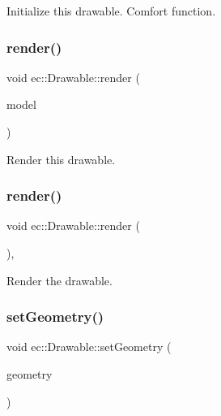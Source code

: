 Initialize this drawable. Comfort function. \mbox{\label{classec_1_1_drawable_ac9d3345bd308fce8c99adbfc12c53106}} 
\subsubsection{\texorpdfstring{render()}{render()}\hspace{0.1cm}{\footnotesize\ttfamily [1/2]}}
{\footnotesize\ttfamily void ec\+::\+Drawable\+::render (\begin{DoxyParamCaption}\item[{const glm\+::mat4 \&}]{model }\end{DoxyParamCaption})\hspace{0.3cm}{\ttfamily [virtual]}}

Render this drawable. \mbox{\label{classec_1_1_drawable_a7da17eae29c09e49d1a8c2c48e85f88a}} 
\subsubsection{\texorpdfstring{render()}{render()}\hspace{0.1cm}{\footnotesize\ttfamily [2/2]}}
{\footnotesize\ttfamily void ec\+::\+Drawable\+::render (\begin{DoxyParamCaption}{ }\end{DoxyParamCaption})\hspace{0.3cm}{\ttfamily [protected]}, {\ttfamily [virtual]}}

Render the drawable. \mbox{\label{classec_1_1_drawable_a76bcb843ef5ced898724fa79a9b20250}} 
\subsubsection{\texorpdfstring{set\+Geometry()}{setGeometry()}}
{\footnotesize\ttfamily void ec\+::\+Drawable\+::set\+Geometry (\begin{DoxyParamCaption}\item[{\mbox{\hyperlink{classec_1_1_i_geometry_access}{I\+Geometry\+Access}} $\ast$}]{geometry }\end{DoxyParamCaption})}

